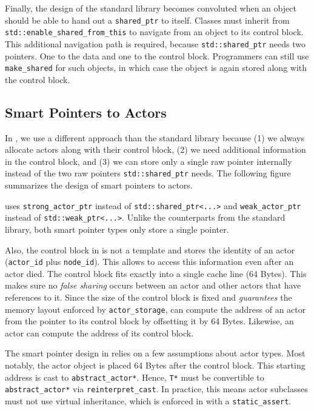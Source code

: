 
Finally, the design of the standard library becomes convoluted when an object should be able to hand out a \lstinline^shared_ptr^ to itself. Classes must inherit from \lstinline^std::enable_shared_from_this^ to navigate from an object to its control block. This additional navigation path is required, because \lstinline^std::shared_ptr^ needs two pointers. One to the data and one to the control block. Programmers can still use \lstinline^make_shared^ for such objects, in which case the object is again stored along with the control block.

\subsection{Smart Pointers to Actors}

In \lib, we use a different approach than the standard library because (1) we always allocate actors along with their control block, (2) we need additional information in the control block, and (3) we can store only a single raw pointer internally instead of the two raw pointers \lstinline^std::shared_ptr^ needs. The following figure summarizes the design of smart pointers to actors.


\lib uses \lstinline^strong_actor_ptr^ instead of \lstinline^std::shared_ptr<...>^ and \lstinline^weak_actor_ptr^ instead of \lstinline^std::weak_ptr<...>^. Unlike the counterparts from the standard library, both smart pointer types only store a single pointer.

Also, the control block in \lib is not a template and stores the identity of an actor (\lstinline^actor_id^ plus \lstinline^node_id^). This allows \lib to access this information even after an actor died. The control block fits exactly into a single cache line (64 Bytes). This makes sure no \emph{false sharing} occurs between an actor and other actors that have references to it. Since the size of the control block is fixed and \lib \emph{guarantees} the memory layout enforced by \lstinline^actor_storage^, \lib can compute the address of an actor from the pointer to its control block by offsetting it by 64 Bytes. Likewise, an actor can compute the address of its control block.

The smart pointer design in \lib relies on a few assumptions about actor types. Most notably, the actor object is placed 64 Bytes after the control block. This starting address is cast to \lstinline^abstract_actor*^. Hence, \lstinline^T*^ must be convertible to \lstinline^abstract_actor*^ via \lstinline^reinterpret_cast^. In practice, this means actor subclasses must not use virtual inheritance, which is enforced in \lib with a \lstinline^static_assert^.

